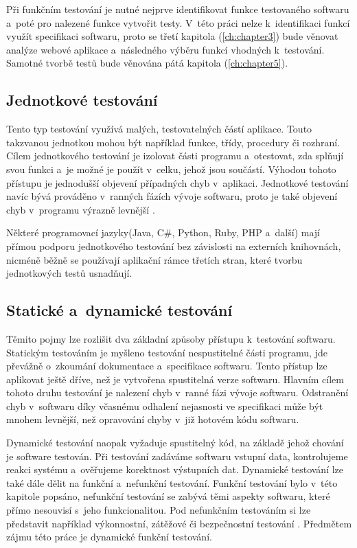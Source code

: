 \documentclass[
    color,   %
	table,   %
    twoside, %
    nolot, nolof,
]{fithesis3}
\begin{document}
Při funkčním testování je nutné nejprve identifikovat funkce testovaného softwaru a~poté pro nalezené funkce vytvořit testy. V~této práci nelze k~identifikaci funkcí využít specifikaci softwaru, proto se třetí kapitola (\ref{ch:chapter3}) bude věnovat analýze webové aplikace a~následného výběru funkcí vhodných k~testování. Samotné tvorbě testů bude věnována pátá kapitola (\ref{ch:chapter5}).

\subsection{Jednotkové testování}
Tento typ testování využívá malých, testovatelných částí aplikace. Touto takzvanou jednotkou mohou být například funkce, třídy, procedury či rozhraní. Cílem jednotkového testování je izolovat části programu a~otestovat, zda splňují svou funkci a~je možné je použít v~celku, jehož jsou součástí. Výhodou tohoto přístupu je jednodušší objevení případných chyb v~aplikaci. Jednotkové testování navíc bývá prováděno v~ranných fázích vývoje softwaru, proto je také objevení chyb v~programu výrazně levnější \cite{UnitISTQB}. 

Některé programovací jazyky(Java, C\#, Python, Ruby, PHP a~další) mají přímou podporu jednotkového testování bez závislosti na externích knihovnách, nicméně běžně se používají aplikační rámce třetích stran, které tvorbu jednotkových testů usnadňují.

\subsection{Statické a~dynamické testování}
Těmito pojmy lze rozlišit dva základní způsoby přístupu k~testování softwaru. Statickým testováním je myšleno testování nespustitelné části programu, jde převážně o~zkoumání dokumentace a~specifikace softwaru. Tento přístup lze aplikovat ještě dříve, než je vytvořena spustitelná verze softwaru\cite{Patton}. Hlavním cílem tohoto druhu testování je nalezení chyb v~ranné fázi vývoje softwaru. Odstranění chyb v~softwaru díky včasnému odhalení nejasnosti ve specifikaci může být mnohem levnější, než opravování chyby v~již hotovém kódu softwaru.

Dynamické testování naopak vyžaduje spustitelný kód, na základě jehož chování je software testován. Při testování zadáváme softwaru vstupní data, kontrolujeme reakci systému a~ověřujeme korektnost výstupních dat. Dynamické testování lze také dále dělit na funkční a~nefunkční testování. Funkční testování bylo v~této kapitole popsáno, nefunkční testování se zabývá těmi aspekty softwaru, které přímo nesouvisí s~jeho funkcionalitou. Pod nefunkčním testováním si lze představit například výkonnostní, zátěžové či bezpečnostní testování \cite{Guru99}. Předmětem zájmu této práce je dynamické funkční testování.
\end{document}
